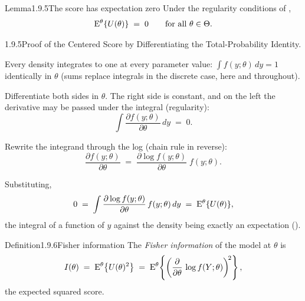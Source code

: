 \documentclass[main.tex]{subfiles}
\begin{document}
\begin{Obj}{Lemma}{1.9.5}{The score has expectation zero}
Under the regularity conditions of ,
\[ \mathrm{E}^{\theta}\{U(\theta)\} \;=\; 0 \qquad\text{for all } \theta\in\Theta . \]
\end{Obj}
\begin{Prf}{1.9.5}{Proof of the Centered Score by Differentiating the Total-Probability Identity.}{}
\item Every density integrates to one at every parameter value:
      $\int f(y;\theta)\,dy = 1$ identically in $\theta$ (sums replace integrals in the
      discrete case, here and throughout).
\item Differentiate both sides in $\theta$. The right side is constant, and on the left the
      derivative may be passed under the integral (regularity):
      \[ \int \frac{\partial f(y;\theta)}{\partial\theta}\,dy \;=\; 0 . \]
\item Rewrite the integrand through the log (chain rule in reverse):
      \[ \frac{\partial f(y;\theta)}{\partial\theta}
         \;=\; \frac{\partial \log f(y;\theta)}{\partial\theta}\; f(y;\theta) . \]
\item Substituting,
      \[ 0 \;=\; \int \frac{\partial \log f(y;\theta)}{\partial\theta}\,
         f(y;\theta)\,dy \;=\; \mathrm{E}^{\theta}\{U(\theta)\} , \]
      the integral of a function of $y$ against the density being exactly an expectation
      ().
\end{Prf}

\begin{Obj}{Definition}{1.9.6}{Fisher information}
The \emph{Fisher information} of the model at $\theta$ is
\[ I(\theta) \;=\; \mathrm{E}^{\theta}\big\{ U(\theta)^2 \big\}
   \;=\; \mathrm{E}^{\theta}\!\left\{\left(\frac{\partial}{\partial\theta}\,
   \log f(Y;\theta)\right)^{\!2}\right\} , \]
the expected squared score.
\end{Obj}
\end{document}
